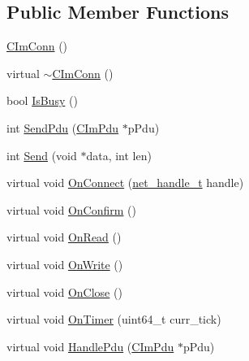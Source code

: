 \subsection*{Public Member Functions}
\begin{DoxyCompactItemize}
\item 
\hyperlink{class_c_im_conn_aad9320b02586c24adebc1b682ff71e93}{C\+Im\+Conn} ()
\item 
virtual \hyperlink{class_c_im_conn_ae2d14f137875f7159342695d201212a9}{$\sim$\+C\+Im\+Conn} ()
\item 
bool \hyperlink{class_c_im_conn_aa433e46206f80f3f5cd0b981be483859}{Is\+Busy} ()
\item 
int \hyperlink{class_c_im_conn_a8ccf0a447c06a7e4c82a402bb9ee1919}{Send\+Pdu} (\hyperlink{class_c_im_pdu}{C\+Im\+Pdu} $\ast$p\+Pdu)
\item 
int \hyperlink{class_c_im_conn_afe36a263e560602bffdd7c3aa1b679f6}{Send} (void $\ast$data, int len)
\item 
virtual void \hyperlink{class_c_im_conn_a6675f76461fc127d026658c6763de896}{On\+Connect} (\hyperlink{base_2ostype_8h_a5e1697fa312aa00ac7305460abf166fd}{net\+\_\+handle\+\_\+t} handle)
\item 
virtual void \hyperlink{class_c_im_conn_a7f173449bf492576c42c9603e85f406a}{On\+Confirm} ()
\item 
virtual void \hyperlink{class_c_im_conn_a32d5dc30804606d4241afd63c39c0347}{On\+Read} ()
\item 
virtual void \hyperlink{class_c_im_conn_a6015911abda030c60baf840f5aa3c42b}{On\+Write} ()
\item 
virtual void \hyperlink{class_c_im_conn_a9874ab69df11d0a6147e2c301013508a}{On\+Close} ()
\item 
virtual void \hyperlink{class_c_im_conn_adc9be86c438a9884b3bf51fd5da180bc}{On\+Timer} (uint64\+\_\+t curr\+\_\+tick)
\item 
virtual void \hyperlink{class_c_im_conn_a0f3ce1718aadfc944328e872cbfafdb9}{Handle\+Pdu} (\hyperlink{class_c_im_pdu}{C\+Im\+Pdu} $\ast$p\+Pdu)
\end{DoxyCompactItemize}
